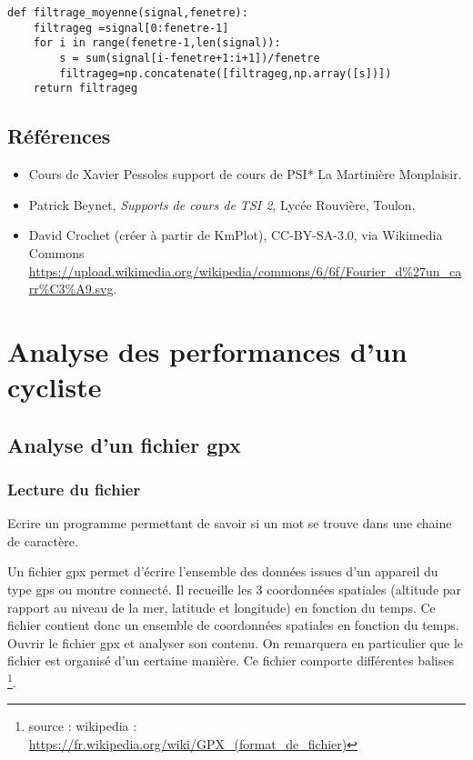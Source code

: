 \begin{lstlisting}
def filtrage_moyenne(signal,fenetre):
    filtrageg =signal[0:fenetre-1]
    for i in range(fenetre-1,len(signal)):
        s = sum(signal[i-fenetre+1:i+1])/fenetre
        filtrageg=np.concatenate([filtrageg,np.array([s])])
    return filtrageg
\end{lstlisting}

\subsection*{Références} 
\begin{itemize}
\item Cours de Xavier Pessoles support de cours de  PSI* La Martinière Monplaisir.
\item Patrick Beynet, \textit{Supports de cours de TSI 2}, Lycée Rouvière, Toulon.
\item David Crochet (créer à partir de KmPlot), CC-BY-SA-3.0, via Wikimedia Commons \url{https://upload.wikimedia.org/wikipedia/commons/6/6f/Fourier_d\%27un_carr\%C3\%A9.svg}.
\end{itemize}

\section*{Analyse des performances d'un cycliste}

\subsection*{Analyse d'un fichier gpx}

\subsubsection*{Lecture du fichier}

 
\question{} Ecrire un programme permettant de savoir si un mot se trouve dans une chaine de caractère.

Un fichier gpx permet d'écrire l'ensemble des données issues d'un appareil du type gps ou montre connecté. Il recueille les 3 coordonnées spatiales (altitude par rapport au niveau de la mer, latitude et longitude) en fonction du temps. Ce fichier contient donc un ensemble de coordonnées spatiales en fonction du temps.
Ouvrir le fichier gpx et analyser son contenu.
On remarquera en particulier que le fichier est organisé d'un certaine manière. Ce fichier comporte différentes balises \footnote{source : wikipedia : \url{https://fr.wikipedia.org/wiki/GPX_(format_de_fichier)}}.

